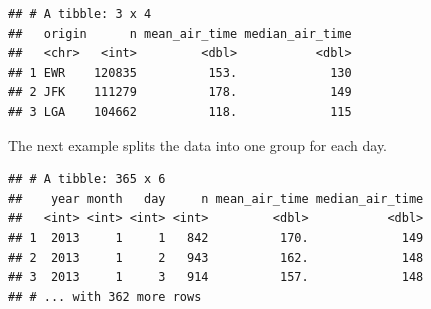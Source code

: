 \documentclass[]{book}
\newenvironment{Shaded}{}{}
\newcommand{\DataTypeTok}[1]{#1}
\newcommand{\KeywordTok}[1]{\textcolor[rgb]{0.00,0.00,1.00}{#1}}
\newcommand{\NormalTok}[1]{#1}
\newcommand{\OperatorTok}[1]{#1}
\newcommand{\OtherTok}[1]{\textcolor[rgb]{1.00,0.25,0.00}{#1}}
\newcommand{\StringTok}[1]{\textcolor[rgb]{0.00,0.50,0.50}{#1}}
\begin{document}
\begin{Shaded}
\end{Shaded}

\begin{verbatim}
## # A tibble: 3 x 4
##   origin      n mean_air_time median_air_time
##   <chr>   <int>         <dbl>           <dbl>
## 1 EWR    120835          153.             130
## 2 JFK    111279          178.             149
## 3 LGA    104662          118.             115
\end{verbatim}

The next example splits the data into one group for each day.

\begin{Shaded}
\end{Shaded}

\begin{verbatim}
## # A tibble: 365 x 6
##    year month   day     n mean_air_time median_air_time
##   <int> <int> <int> <int>         <dbl>           <dbl>
## 1  2013     1     1   842          170.             149
## 2  2013     1     2   943          162.             148
## 3  2013     1     3   914          157.             148
## # ... with 362 more rows
\end{verbatim}
\end{document}
